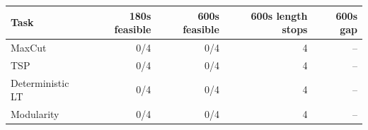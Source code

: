 \begin{tabular}{lrrrr}
\toprule
Task & 180s feasible & 600s feasible & 600s length stops & 600s gap \\
\midrule
MaxCut & 0/4 & 0/4 & 4 & -- \\
TSP & 0/4 & 0/4 & 4 & -- \\
Deterministic LT & 0/4 & 0/4 & 4 & -- \\
Modularity & 0/4 & 0/4 & 4 & -- \\
\bottomrule
\end{tabular}
